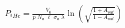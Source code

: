 


\begin{eqnarray*}
  P_{^3He} = \frac{V_0}{p \; N_a \; \ell \; \sigma_a \; \lambda} 
             \ln \left( \sqrt{\frac{1+A_{out}}{1-A_{out}}} \right)
\end{eqnarray*}

